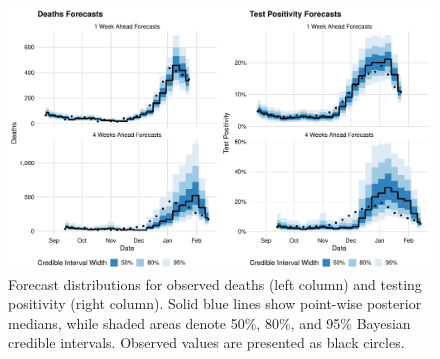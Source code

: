 \begin{figure}[htbp]
    \centering
    \includegraphics[width=1.0\columnwidth]{combined_forecast_plot}
    \caption{Forecast distributions for observed deaths (left column) and testing positivity (right column).
    Solid blue lines show point-wise posterior medians, while shaded areas denote 50\%, 80\%, and 95\% Bayesian credible intervals.
    Observed values are presented as black circles.}
    \label{ch_4:fig:combined_forecast_plot}
\end{figure}

